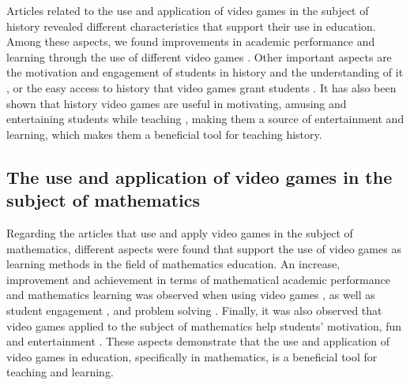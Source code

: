\documentclass[english]{textolivre}
\begin{document}
Articles related to the use and application of video games in the subject of history revealed different characteristics that support their use in education. Among these aspects, we found improvements in academic performance and learning through the use of different video games \cite{sar_role_2012,cornella_canals_design_2013,yu_exploration_2014,saez-lopez_exploring_2015,evaristo_chiyong_uso_2016,bokolas_between_2019,Rea-Penafiel_2020,jaldon-mendez_sanchez_uso_2021}. Other important aspects are the motivation and engagement of students in history \cite{watson_case_2011,yu_exploration_2014,martinez_soto_evaluacion_2018,bokolas_between_2019,gali_visiting_2019,Rea-Penafiel_2020,jaldon-mendez_sanchez_uso_2021,ruth_commercial_2021} and the understanding of it \cite{gali_visiting_2019,Rea-Penafiel_2020,ruth_commercial_2021,jaldon-mendez_sanchez_uso_2021}, or the easy access to history that video games grant students \cite{gilbert__2019,ruth_commercial_2021}. It has also been shown that history video games are useful in motivating, amusing and entertaining students while teaching \cite{cornella_canals_design_2013,saez-lopez_exploring_2015}, making them a source of entertainment and learning, which makes them a beneficial tool for teaching history.

\subsection{The use and application of video games in the subject of mathematics}
Regarding the articles that use and apply video games in the subject of mathematics, different aspects were found that support the use of video games as learning methods in the field of mathematics education. An increase, improvement and achievement in terms of mathematical academic performance and mathematics learning was observed when using video games \cite{graziano_enhanced_1999,kebritchi_effects_2010,chen_design_2014,deater-deckard_student_2014,goldin_far_2014,drigas_line_2015,kiili_using_2015,hieftje_evaluation_2017,hussain_digital_2017,kert_comparing_2017,kim_effects_2017,barrios_matelogic:_2018,del_moral_perez_game-based_2018,fokides_digital_2018,albarracin_secuencia_2021,holguin-alvarez_gamificacion_2019,pires_building_2019,baig_effect_2020,albarracin_taller_2019,fraga-varela_impact_2021,yong_let_2021,ester_aprender_2022,holguin-alvarez_gamificacion_2022,holguin-alvarez_modificacion_2022,karki_improving_2022,medina_camacho_harnessing_2022,praveen_kumar_g._influence_2022,walkington_effect_2022}, as well as student engagement \cite{deater-deckard_student_2014,wisittanawat_tricky_2021,hanghoj_digital_2022,pradiante_contribution_2022}, and problem solving \cite{drigas_line_2015,albarracin_secuencia_2021,holguin-alvarez_gamificacion_2019}. Finally, it was also observed that video games applied to the subject of mathematics help students’ motivation, fun and entertainment \cite{alzahrani_evaluation_2013,drigas_line_2015,mangowal_mathbharata:_2017,Li_2018,nunes_liber_2022,pradiante_contribution_2022}. These aspects demonstrate that the use and application of video games in education, specifically in mathematics, is a beneficial tool for teaching and learning.
\end{document}
